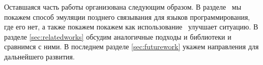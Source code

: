 Оставшаяся часть работы организована следующим образом. В разделе~\cite{section2} мы покажем способ эмуляции позднего связывания для языков программирования, где его нет, а также покажем покажем как использование \GT~улучшает ситуацию. 
В разделе \ref{sec:relatedworks} обсудим аналогичные подходы и библиотеки и сравнимся с ними. В последнем разделе \ref{sec:futurework} укажем направления для дальнейшего развития.
\begin{comment}
 В следующем разделе \ref{sec:expo} мы неформально опишем наш подход с помощью примеров. Затем \ref{sec:implementation} опишем реализацию в деталях, подчеркнув аспекты, которые считаем важными или интересными. Далее представим несколько примеров, реализованных \ref{sec:examples} с помощью нашей библиотеки. В разделе \ref{sec:relatedworks} обсудим аналогичные подходы и библиотеки и сравнимся с ними. В последнем разделе \ref{sec:futurework} укажем направления для дальнейшего развития.
\end{comment}

